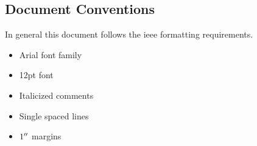     \subsection{Document Conventions}\label{sec:document-conventions}
        In general this document follows the \gls{ieee} formatting requirements.
            \begin{itemize}
                \item Arial font family
                \item 12pt font
                \item Italicized comments
                \item Single spaced lines
                \item $1^{\prime\prime}$ margins
            \end{itemize}
